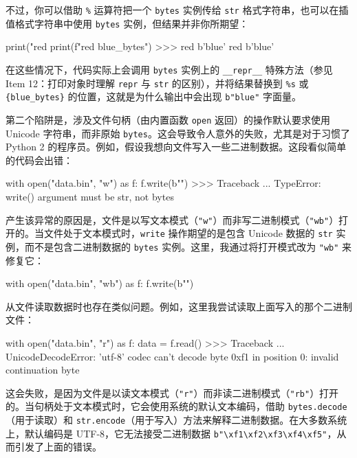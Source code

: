 不过，你可以借助 \texttt{\%} 运算符把一个 \texttt{bytes} 实例传给 \texttt{str} 格式字符串，也可以在插值格式字符串中使用 \texttt{bytes} 实例，但结果并非你所期望：

\begin{codebox}[python]
print("red %
print(f"red {blue_bytes}")
>>>
red b'blue'
red b'blue'
\end{codebox}

在这些情况下，代码实际上会调用 \texttt{bytes} 实例上的 \texttt{\_\_repr\_\_} 特殊方法（参见 Item 12：打印对象时理解 \texttt{repr} 与 \texttt{str} 的区别），并将结果替换到 \texttt{\%s} 或 \texttt{\{blue\_bytes\}} 的位置，这就是为什么输出中会出现 \texttt{b"blue"} 字面量。

第二个陷阱是，涉及文件句柄（由内置函数 \texttt{open} 返回）的操作默认要求使用 Unicode 字符串，而非原始 \texttt{bytes}。这会导致令人意外的失败，尤其是对于习惯了 Python 2 的程序员。例如，假设我想向文件写入一些二进制数据。这段看似简单的代码会出错：

\begin{codebox}[python]
with open("data.bin", "w") as f:
    f.write(b"")
>>>
Traceback ...
TypeError: write() argument must be str, not bytes
\end{codebox}

产生该异常的原因是，文件是以写文本模式（\texttt{"w"}）而非写二进制模式（\texttt{"wb"}）打开的。当文件处于文本模式时，\texttt{write} 操作期望的是包含 Unicode 数据的 \texttt{str} 实例，而不是包含二进制数据的 \texttt{bytes} 实例。这里，我通过将打开模式改为 \texttt{"wb"} 来修复它：

\begin{codebox}[python]
with open("data.bin", "wb") as f:
    f.write(b"")
\end{codebox}

从文件读取数据时也存在类似问题。例如，这里我尝试读取上面写入的那个二进制文件：

\begin{codebox}[python]
with open("data.bin", "r") as f:
    data = f.read()
>>>
Traceback ...
UnicodeDecodeError: 'utf-8' codec can't decode byte 0xf1 in
position 0: invalid continuation byte
\end{codebox}

这会失败，是因为文件是以读文本模式（\texttt{"r"}）而非读二进制模式（\texttt{"rb"}）打开的。当句柄处于文本模式时，它会使用系统的默认文本编码，借助 \texttt{bytes.decode}（用于读取）和 \texttt{str.encode}（用于写入）方法来解释二进制数据。在大多数系统上，默认编码是 UTF-8，它无法接受二进制数据 \texttt{b"\textbackslash xf1\textbackslash xf2\textbackslash xf3\textbackslash xf4\textbackslash xf5"}，从而引发了上面的错误。

